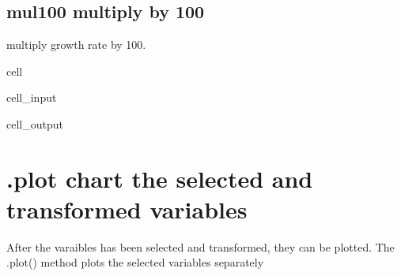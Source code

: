 \documentclass[letterpaper,10pt,english]{jupyterBook}
\begin{document}
\subsection{mul100 multiply by 100}
\label{\detokenize{content/notebooks/modelflow_features:mul100-multiply-by-100}}
\sphinxAtStartPar
multiply growth rate by 100.

\begin{sphinxuseclass}{cell}\begin{sphinxVerbatimInput}

\begin{sphinxuseclass}{cell_input}
\begin{sphinxVerbatim}[commandchars=\\\{\}]
\PYG{p}{[}\PYG{p}{]} 
\end{sphinxVerbatim}

\end{sphinxuseclass}\end{sphinxVerbatimInput}
\begin{sphinxVerbatimOutput}

\begin{sphinxuseclass}{cell_output}
\noindent{}

\end{sphinxuseclass}\end{sphinxVerbatimOutput}

\end{sphinxuseclass}

\section{.plot chart the selected and transformed variables}
\label{\detokenize{content/notebooks/modelflow_features:plot-chart-the-selected-and-transformed-variables}}
\sphinxAtStartPar
After the varaibles has been selected and transformed, they can  be plotted. The .plot() method plots the selected variables separately
\end{document}

